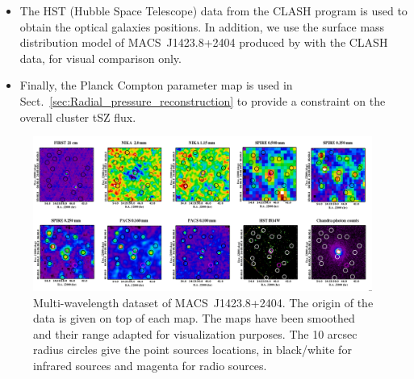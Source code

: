 \documentclass[twocolumn,traditabstract]{aa}
\begin{document}
\begin{itemize}
\item The HST (Hubble Space Telescope) data from the CLASH program \citep[][Cluster Lensing And Supernova survey with Hubble]{postman2012} is used to obtain the optical galaxies positions. In addition, we use the surface mass distribution model of \mbox{MACS~J1423.8+2404} produced by \cite{zitrin2011} with the CLASH data, for visual comparison only.
\item Finally, the Planck Compton parameter map \citep{planck2015XXII} is used in Sect.~\ref{sec:Radial_pressure_reconstruction} to provide a constraint on the overall cluster tSZ flux.
\end{itemize}
\begin{figure}[h]
\centering
\includegraphics[trim=0cm 0cm 0cm 0cm, clip=true, width=0.99\textwidth]{Figure/MACSJ1424_multicolor.png}
\caption{Multi-wavelength dataset of \mbox{MACS~J1423.8+2404}. The origin of the data is given on top of each map. The maps have been smoothed and their range adapted for visualization purposes. The 10 arcsec radius circles give the point sources locations, in black/white for infrared sources and magenta for radio sources.}
\label{fig:MACSJ1424_mutiw2}
\end{figure}
\end{document}
